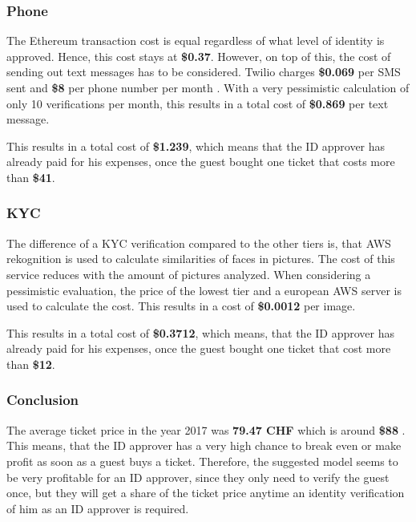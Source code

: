 \subsubsection{Phone}
The Ethereum transaction cost is equal regardless of what level of identity is approved. Hence, this cost stays at \textbf{\$0.37}. However, on top of this, the cost of sending out text messages has to be considered. Twilio charges \textbf{\$0.069} per SMS sent and \textbf{\$8} per phone number per month \cite{twillio-Cost}. With a very pessimistic calculation of only 10 verifications per month, this results in a total cost of \textbf{\$0.869} per text message.

This results in a total cost of \textbf{\$1.239}, which means that the ID approver has already paid for his expenses, once the guest bought one ticket that costs more than \textbf{\$41}.

\subsubsection{KYC}
The difference of a KYC verification compared to the other tiers is, that AWS rekognition is used to calculate similarities of faces in pictures. The cost of this service reduces with the amount of pictures analyzed. When considering a pessimistic evaluation, the price of the lowest tier and a european AWS server is used to calculate the cost. This results in a cost of \textbf{\$0.0012} per image\cite{AWS-Cost}.

This results in a total cost of \textbf{\$0.3712}, which means, that the ID approver has already paid for his expenses, once the guest bought one ticket that cost more than \textbf{\$12}.

\subsubsection{Conclusion}
The average ticket price in the year 2017 was \textbf{79.47 CHF} which is around \textbf{\$88} \cite{Ticket-Price}. This means, that the ID approver has a very high chance to break even or make profit as soon as a guest buys a ticket. Therefore, the suggested model seems to be very profitable for an ID approver, since they only need to verify the guest once, but they will get a share of the ticket price anytime an identity verification of him as an ID approver is required.
